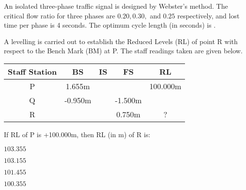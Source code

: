 \iffalse
\chapter{2014}
\author{AI24BTECH11014}
\section{ce}
\fi

    \item An isolated three-phase traffic signal is designed by Webster's method. The critical flow ratio for three phases are $0.20, 0.30,$ and $0.25$ respectively, and lost time per phase is 4 seconds. The optimum cycle length (in seconds) is \underline{\hspace{1cm}}.
 
\item A levelling is carried out to establish the Reduced Levels (RL) of point R with respect to the Bench Mark (BM) at P. The staff readings taken are given below. \\
  \begin{table}[h]
        \centering
        \begin{tabular}{|c|c|c|c|c|}
        \hline
        Staff Station & BS & IS & FS & RL \\
        \hline
        P & 1.655m &  &  & 100.000m \\
        \hline
        Q & -0.950m &  & -1.500m & \\
        \hline
        R &  &  & 0.750m & ? \\
        \hline
        \end{tabular}
    \end{table}

If RL of P is +100.000m, then RL (in m) of R is:
    \begin{enumerate}
        \begin{multicols}{2}
            \item $103.355$
            \item $103.155$
            \item $101.455$
            \item $100.355$
        \end{multicols}
    \end{enumerate}

